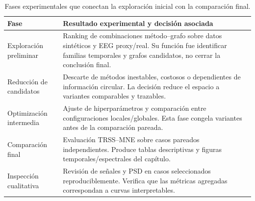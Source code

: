 \begin{table}[htbp]
\centering
\small
\setlength{\tabcolsep}{5pt}
\caption{Fases experimentales que conectan la exploración inicial con la comparación final.}
\label{tab:ch4_experimental_phase_overview}
\begin{tabular}{@{}>{\raggedright\arraybackslash}p{3.2cm}>{\raggedright\arraybackslash}p{8.1cm}@{}}
\toprule
Fase & Resultado experimental y decisión asociada \\
\midrule
Exploración preliminar & Ranking de combinaciones método--grafo sobre datos sintéticos y EEG proxy/real. Su función fue identificar familias temporales y grafos candidatos, no cerrar la conclusión final. \\
Reducción de candidatos & Descarte de métodos inestables, costosos o dependientes de información circular. La decisión reduce el espacio a variantes comparables y trazables. \\
Optimización intermedia & Ajuste de hiperparámetros y comparación entre configuraciones locales/globales. Esta fase congela variantes antes de la comparación pareada. \\
Comparación final & Evaluación TRSS--MNE sobre casos pareados independientes. Produce tablas descriptivas y figuras temporales/espectrales del capítulo. \\
Inspección cualitativa & Revisión de señales y PSD en casos seleccionados reproduciblemente. Verifica que las métricas agregadas correspondan a curvas interpretables. \\
\bottomrule
\end{tabular}
\end{table}
